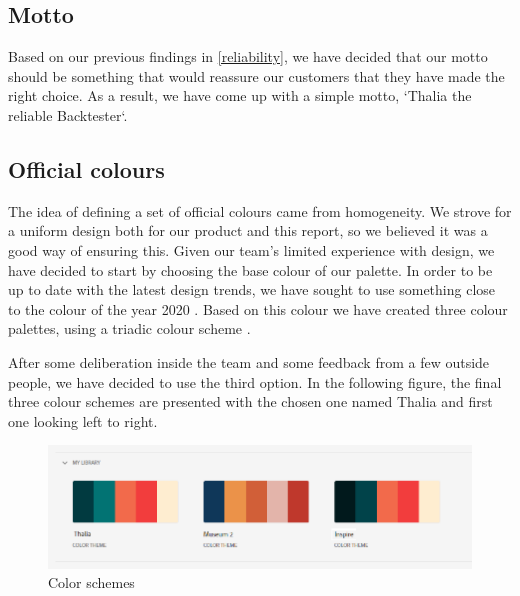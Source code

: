 \documentclass[main.tex]{subfiles}
\begin{document}
\subsection{Motto}

Based on our previous findings in \ref{reliability}, we have decided that our motto should be something that would reassure our customers that they have made the right choice. As a result, we have come up with a simple motto, `Thalia the reliable Backtester`.


\subsection{Official colours} 

The idea of defining a set of official colours came from homogeneity. We strove for a uniform design both for our product and this report, so we believed it was a good way of ensuring this. Given our team's limited experience with design, we have decided to start by choosing the base colour of our palette. In order to be up to date with the latest design trends, we have sought to use something close to the colour of the year 2020 \cite{pantone}. Based on this colour we have created three colour palettes, using a triadic colour scheme \cite{triadic}.

After some deliberation inside the team and some feedback from a few outside people, we have decided to use the third option. In the following figure, the final three colour schemes are presented with the chosen one named Thalia and first one looking left to right.

\begin{figure}[H]
    \includegraphics[width=\textwidth]{00Branding/00Pictures/color_schemes.png}
    \caption{Color schemes}
\end{figure}
\end{document}
